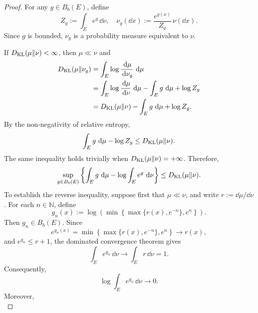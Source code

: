 \documentclass[12pt,a4paper,oneside]{book}
\begin{document}
\begin{proof}
For any $g\in B_b(E)$, define
\begin{equation*}
    Z_g:=\int_E e^g\,\dd\nu, \quad \nu_g(\dd x):=\frac{e^{g(x)}}{Z_g}\,\nu(\dd x).
\end{equation*}
Since $g$ is bounded, $\nu_g$ is a probability measure equivalent to $\nu$.

If $D_{\mathrm{KL}}(\mu\Vert\nu)<\infty$, then $\mu\ll\nu$ and
\begin{equation*}
    \begin{aligned}
        D_{\mathrm{KL}}(\mu\Vert\nu_g)
        &= \int_E \log\frac{\,\mathrm{d}\mu}{\,\mathrm{d}\nu_g}\,\,\mathrm{d}\mu\\
        &= \int_E \log\frac{\,\mathrm{d}\mu}{\,\mathrm{d}\nu}\,\,\mathrm{d}\mu - \int_E g\,\,\mathrm{d}\mu + \log Z_g\\
        &= D_{\mathrm{KL}}(\mu\Vert\nu) - \int_E g\,\,\mathrm{d}\mu + \log Z_g.
    \end{aligned}
\end{equation*}
By the non-negativity of relative entropy,
\begin{equation*}
    \int_E g\,\,\mathrm{d}\mu-\log Z_g \leq D_{\mathrm{KL}}(\mu\Vert\nu).
\end{equation*}
The same inequality holds trivially when $D_{\mathrm{KL}}(\mu\Vert\nu)=+\infty$. Therefore,
\begin{equation}
    \sup_{g\in B_b(E)}
    \left\{
        \int_E g\,\,\mathrm{d}\mu - \log\int_E e^g\,\,\mathrm{d}\nu
    \right\}
    \leq D_{\mathrm{KL}}(\mu\Vert\nu).
    \label{eq:dv-upper-bound}
\end{equation}
To establish the reverse inequality, suppose first that $\mu\ll\nu$, and write $r:= \dd\mu / \dd\nu$. For each
$n\in\mathbb N$, define
\begin{equation*}
    g_n(x) :=
    \log\left(
        \min\left\{
            \max\{r(x),e^{-n}\},e^n
        \right\}
    \right).
\end{equation*}
Then $g_n\in B_b(E)$. Since
\begin{equation*}
    e^{g_n(x)} =
    \min\left\{
        \max\{r(x),e^{-n}\},e^n
    \right\}
    \longrightarrow r(x),
\end{equation*}
and $e^{g_n}\leq r+1$, the dominated convergence theorem gives
\begin{equation*}
    \int_E e^{g_n}\,\dd\nu
    \longrightarrow
    \int_E r\,\dd\nu=1.
\end{equation*}
Consequently,
\begin{equation*}
    \log\int_E e^{g_n}\,\dd\nu\longrightarrow 0.
\end{equation*}
Moreover,
\begin{equation*}

\end{equation*}
\end{proof}
\end{document}
